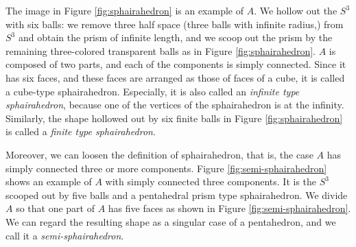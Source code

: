The image in Figure \ref{fig:sphairahedron}
is an example of $A$.
We hollow out the $S^3$ with six balls: we remove three half space
(three balls with infinite radius,) from $S^3$ and obtain the prism of
infinite length, and we scoop out the prism by the remaining
three-colored transparent balls as in Figure \ref{fig:sphairahedron}.
$A$ is composed of two parts, and each of the components is simply connected.
Since it has six faces, and these faces are arranged as those of faces of
a cube, it is called a cube-type sphairahedron.
Especially, it is also called an \textit{infinite type sphairahedron},
because one of the vertices of the sphairahedron is at the infinity.
Similarly, the shape hollowed out by six finite balls in Figure
\ref{fig:sphairahedron} is called a
\textit{finite type sphairahedron}.

Moreover, we can loosen the definition of sphairahedron,
that is, the case $A$ has simply connected three or more components.
Figure \ref{fig:semi-sphairahedron} shows an
example of $A$ with simply connected three components.
It is the $S^3$ scooped out by five balls and a pentahedral prism type
sphairahedron.
We divide $A$ so that one part of $A$ has five faces as shown in
Figure \ref{fig:semi-sphairahedron}.
We can regard the resulting shape as a singular case of a pentahedron,
and we call it a \textit{semi-sphairahedron}.

